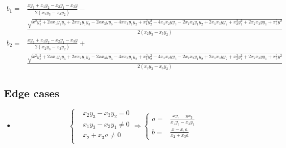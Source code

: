 \documentclass{article}
\begin{document}
\begin{landscape}
    \begin{equation}
        \begin{aligned}
            b_1 = & \frac{x y_{3} + x_{1} y_{2} - x_{2} y_{1} - x_{3} y}{2 \left(x_{2} y_{3} - x_{3} y_{2}\right)} - \\
                  & \frac{\sqrt{x^{2} y_{3}^{2} + 2 x x_{1} y_{2} y_{3} + 2 x x_{2} y_{1} y_{3} - 2 x x_{3} y y_{3} - 4 x x_{3} y_{1} y_{2} + x_{1}^{2} y_{2}^{2} - 4 x_{1} x_{2} y y_{3} - 2 x_{1} x_{2} y_{1} y_{2} + 2 x_{1} x_{3} y y_{2} + x_{2}^{2} y_{1}^{2} + 2 x_{2} x_{3} y y_{1} + x_{3}^{2} y^{2}}}{2 \left(x_{2} y_{3} - x_{3} y_{2}\right)} \\
            b_2 = & \frac{x y_{3} + x_{1} y_{2} - x_{2} y_{1} - x_{3} y}{2 \left(x_{2} y_{3} - x_{3} y_{2}\right)} + \\ 
                  & \frac{\sqrt{x^{2} y_{3}^{2} + 2 x x_{1} y_{2} y_{3} + 2 x x_{2} y_{1} y_{3} - 2 x x_{3} y y_{3} - 4 x x_{3} y_{1} y_{2} + x_{1}^{2} y_{2}^{2} - 4 x_{1} x_{2} y y_{3} - 2 x_{1} x_{2} y_{1} y_{2} + 2 x_{1} x_{3} y y_{2} + x_{2}^{2} y_{1}^{2} + 2 x_{2} x_{3} y y_{1} + x_{3}^{2} y^{2}}}{2 \left(x_{2} y_{3} - x_{3} y_{2}\right)}
        \end{aligned}
    \end{equation}

    \subsection*{Edge cases}

    \begin{itemize}
        \item 
    
        \begin{equation}
            \left\{
            \begin{aligned}
                & x_2 y_3 - x_3 y_2 = 0 \\
                & x_1 y_3 - x_3 y_1 \neq 0 \\
                & x_2 + x_3 a \neq 0 \\
            \end{aligned}
            \right.
            \Rightarrow
            \left\{
            \begin{aligned}
                a = & \frac{x y_3 - y x_3}{x_1 y_3 - x_3 y_1}\\
                b = & \frac{x - x_1 a}{x_2 + x_3 a}     
            \end{aligned}
            \right.
        \end{equation}


\end{itemize}
\end{landscape}
\end{document}
